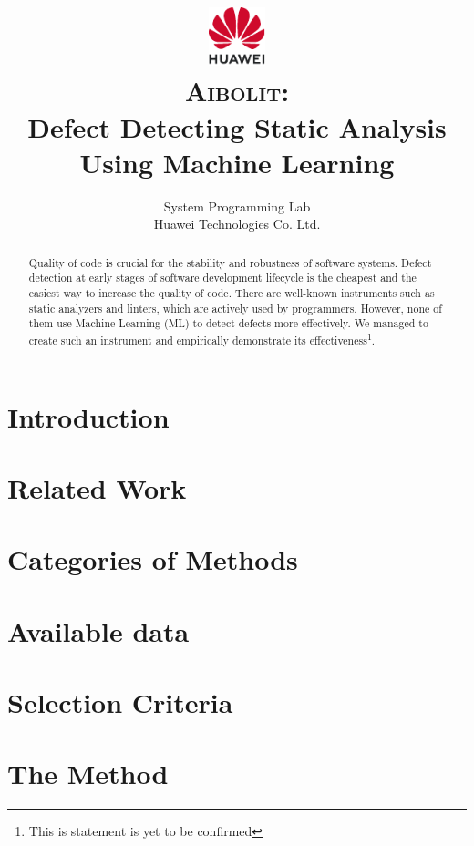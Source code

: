 \documentclass[12pt]{article}
\title{
  \includegraphics[height=48pt]{logo}\\
  \textsc{Aibolit}:\\
  Defect Detecting Static Analysis\\
  Using Machine Learning}
\author{
	System Programming Lab\\
	Huawei Technologies Co. Ltd.
}
\begin{document}
\maketitle

\begin{abstract}
Quality of code is crucial for the stability and robustness
of software systems. Defect detection at early stages of
software development lifecycle is the cheapest and the easiest
way to increase the quality of code. There are well-known
instruments such as static analyzers and linters, which are
actively used by programmers. However, none of them use Machine
Learning (ML) to detect defects more effectively. 
We managed to create such an instrument and empirically demonstrate 
its effectiveness\footnote{This is statement is yet to be confirmed}. 
\end{abstract}

\pagebreak

\section{Introduction}


\section{Related Work}
\label{sec:related}


\section{Categories of Methods}
\label{sec:categories}


\section{Available data}
\label{sec:data}


\section{Selection Criteria}
\label{sec:criteria}


\section{The Method}
\label{sec:method}

\end{document}
